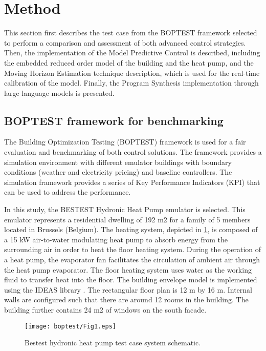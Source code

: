 \newpage
\section{Method}
\label{sec:method}
This section first describes the test case from the BOPTEST framework selected to perform a comparison and assessment of both advanced control strategies. Then, the implementation of the Model Predictive Control is described, including the embedded reduced order model of the building and the heat pump, and the Moving Horizon Estimation technique description, which is used for the real-time calibration of the model. Finally, the Program Synthesis implementation through large language models is presented.


\subsection{BOPTEST framework for benchmarking}
\label{sec:BOPTEST}
The Building Optimization Testing (BOPTEST) framework \cite{Blum2021} is used for a fair evaluation and benchmarking of both control solutions. The framework provides a simulation environment with different emulator buildings with boundary conditions (weather and electricity pricing) and baseline controllers. The simulation framework provides a series of Key Performance Indicators (KPI) that can be used to address the performance.

In this study, the BESTEST Hydronic Heat Pump emulator is selected. This emulator represents a residential dwelling of 192 m2 for a family of 5 members located in Brussels (Belgium).  The heating system, depicted in \ref{fig:1}, is composed of a 15 kW air-to-water modulating heat pump to absorb energy from the surrounding air in order to heat the floor heating system. During the operation of a heat pump, the evaporator fan facilitates the circulation of ambient air through the heat pump evaporator. The floor heating system uses water as the working fluid to transfer heat into the floor. The building envelope model is implemented using the IDEAS library \cite{Jorissen2018}. The rectangular floor plan is 12 m by 16 m. Internal walls are configured such that there are around 12 rooms in the building. The building further contains 24 m2 of windows on the south facade.

\begin{figure}
  \texttt{[image: boptest/Fig1.eps]}
\caption{Bestest hydronic heat pump test case system schematic.}
\label{fig:1}       %
\end{figure}
%

